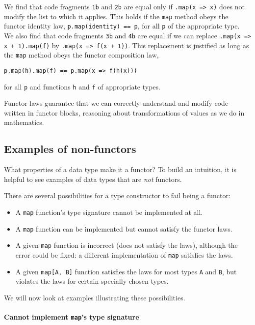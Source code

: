 We find that code fragments \lstinline!1b! and \lstinline!2b! are
equal only if \lstinline!.map(x => x)! does not modify the list to
which it applies. This holds if the \lstinline!map! method obeys
the functor identity law, \lstinline!p.map(identity) == p!, for all
\lstinline!p! of the appropriate type. We also find that code fragments
\lstinline!3b! and \lstinline!4b! are equal if we can replace \lstinline!.map(x => x + 1).map(f)!
by \lstinline!.map(x => f(x + 1))!. This replacement is justified
as long as the \lstinline!map! method obeys the functor composition
law, 
\begin{lstlisting}
p.map(h).map(f) == p.map(x => f(h(x)))
\end{lstlisting}
for all \lstinline!p! and functions \lstinline!h! and \lstinline!f!
of appropriate types.

Functor laws guarantee that we can correctly understand and modify
code written in functor blocks, reasoning about transformations of
values as we do in mathematics.

\subsection{Examples of non-functors\label{subsec:Examples-of-non-functors}}

What properties of a data type make it a functor? To build an intuition,
it is helpful to see examples of data types that are \emph{not} functors.

There are several possibilities for a type constructor to fail being
a functor:
\begin{itemize}
\item A \lstinline!map! function\textsf{'}s type signature cannot be implemented
at all.
\item A \lstinline!map! function can be implemented but cannot satisfy
the functor laws.
\item A given \lstinline!map! function is incorrect (does not satisfy the
laws), although the error could be fixed: a different implementation
of \lstinline!map! satisfies the laws.
\item A given \lstinline!map[A, B]! function satisfies the laws for most
types \lstinline!A! and \lstinline!B!, but violates the laws for
certain specially chosen types.
\end{itemize}
We will now look at examples illustrating these possibilities.

\paragraph{Cannot implement \texttt{map}\textsf{'}s type signature}

